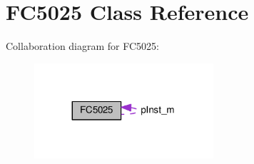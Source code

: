 \hypertarget{classFC5025}{}\section{F\+C5025 Class Reference}
\label{classFC5025}


Collaboration diagram for F\+C5025\+:
\nopagebreak
\begin{figure}[H]
\begin{center}
\leavevmode
\includegraphics[width=188pt]{classFC5025__coll__graph}
\end{center}
\end{figure}
